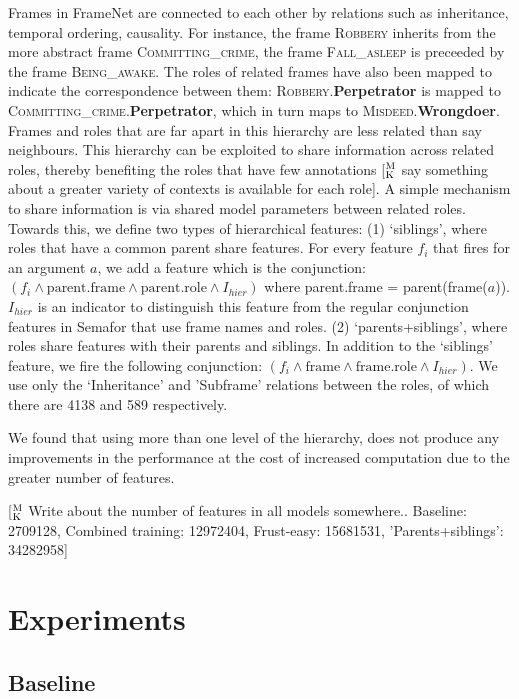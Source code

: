 \documentclass[11pt,a4paper]{article}
\newcommand{\ensuretext}[1]{#1}
\newcommand{\mkmarker}{\ensuretext{\textcolor{mdgreen}{\ensuremath{^{\textsc{M}}_{\textsc{K}}}}}}
\newcommand{\arkcomment}[3]{\ensuretext{\textcolor{#3}{[#1 #2]}}}
\newcommand{\mk}[1]{\arkcomment{\mkmarker}{#1}{mdgreen}}
\newcommand{\fnf}[1]{\textsc{\textsf{#1}}} %
\newcommand{\fnr}[1]{\textbf{\textsf{#1}}} %
\begin{document}
Frames in FrameNet are connected to each other by relations such as inheritance, temporal ordering, causality. 
For instance, the frame \fnf{Robbery} inherits from the more abstract frame \fnf{Committing\_crime}, the 
frame \fnf{Fall\_asleep} is preceeded by the frame \fnf{Being\_awake}. The roles of related frames have 
also been mapped to indicate the correspondence between them: \fnf{Robbery}.\fnr{Perpetrator} is mapped to 
\fnf{Committing\_crime}.\fnr{Perpetrator}, which in turn maps to \fnf{Misdeed}.\fnr{Wrongdoer}. Frames and roles that are far
apart in this hierarchy are less related than say neighbours.
This hierarchy can be exploited to share information across related roles, thereby benefiting the roles 
that have few annotations \mk{say something about a greater variety of contexts is available for each role}. 
A simple mechanism to share information is via shared model parameters between related roles. Towards this, we define two types of
hierarchical features: (1) `siblings', where roles that have a common parent share features. For every feature $f_i$ 
that fires for an argument $a$, we add a feature which is the conjunction: 
$(f_i \wedge \textrm{parent.frame} \wedge \textrm{parent.role} \wedge I_{hier})$ where parent.frame = parent(frame($a$)). 
$I_{hier}$ is an indicator to distinguish this feature from the regular conjunction features in Semafor that use frame names and roles.
(2) `parents+siblings', where roles share features with their parents and siblings. In addition to the `siblings' feature, 
we fire the following conjunction: $(f_i \wedge \textrm{frame} \wedge \textrm{frame.role} \wedge I_{hier})$.
We use only the `Inheritance' and 'Subframe' relations between the roles, of which there are 4138 and 589 respectively.

We found that using more than one level of the hierarchy, does not produce any improvements in the performance at the cost of
increased computation due to the greater number of features.

\mk{Write about the number of features in all models somewhere.. 
Baseline: 2709128, Combined training: 12972404, Frust-easy: 15681531, 'Parents+siblings': 34282958}

\section{Experiments}




\subsection{Baseline}
\end{document}
